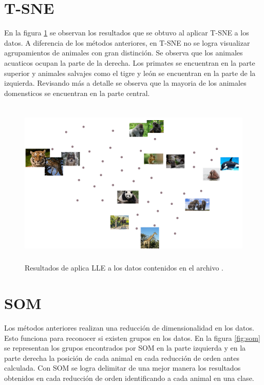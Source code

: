 \section*{T-SNE}

En la figura \ref{fig:tsne} se observan los resultados que se obtuvo al aplicar T-SNE a los datos. A diferencia de los métodos anteriores, en T-SNE no se logra visualizar agrupamientos de animales con gran distinción. Se observa que los animales acuaticos ocupan la parte de la derecha. Los primates se encuentran en la parte superior y animales salvajes como el tigre y león se encuentran en la parte de la izquierda. Revisando más a detalle se observa que la mayoria de los animales domensticos se encuentran en la parte central.

\begin{figure}[H]
    \centering
    \includegraphics[height=8cm,width=12cm]{Graphics/TSNE.png}
    \caption{Resultados de aplica LLE a los datos contenidos en el archivo .}
    \label{fig:tsne}
\end{figure}

\section*{SOM}

Los métodos anteriores realizan una reducción de dimensionalidad en los datos. Esto funciona para reconocer si existen grupos en los datos. En la figura \ref{fig:som} se representan los grupos encontrados por SOM en la parte izquierda y en la parte derecha la posición de cada animal en cada reducción de orden antes calculada. Con SOM se logra delimitar de una mejor manera los resultados obtenidos en cada reducción de orden identificando a cada animal en una clase.

